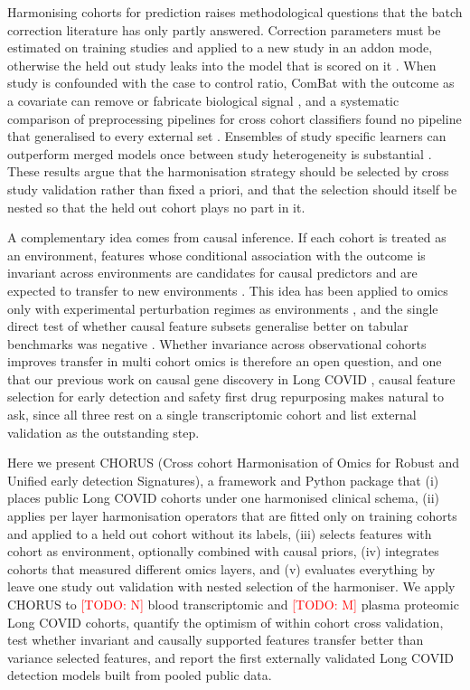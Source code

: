 \documentclass[unnumsec,webpdf,contemporary,large]{oup-authoring-template}
\newcommand{\todo}[1]{\textcolor{red}{[TODO: #1]}}
\begin{document}
Harmonising cohorts for prediction raises methodological questions that the batch correction literature has only partly answered. Correction parameters must be estimated on training studies and applied to a new study in an addon mode, otherwise the held out study leaks into the model that is scored on it \citep{hornung2017,parker2014}. When study is confounded with the case to control ratio, ComBat with the outcome as a covariate can remove or fabricate biological signal \citep{nygaard2016,zindler2020}, and a systematic comparison of preprocessing pipelines for cross cohort classifiers found no pipeline that generalised to every external set \citep{van2024}. Ensembles of study specific learners can outperform merged models once between study heterogeneity is substantial \citep{patil2018}. These results argue that the harmonisation strategy should be selected by cross study validation rather than fixed a priori, and that the selection should itself be nested so that the held out cohort plays no part in it.

A complementary idea comes from causal inference. If each cohort is treated as an environment, features whose conditional association with the outcome is invariant across environments are candidates for causal predictors and are expected to transfer to new environments \citep{peters2016,pfister2021,rothenhausler2021}. This idea has been applied to omics only with experimental perturbation regimes as environments \citep{meinshausen2016}, and the single direct test of whether causal feature subsets generalise better on tabular benchmarks was negative \citep{nastl2024}. Whether invariance across observational cohorts improves transfer in multi cohort omics is therefore an open question, and one that our previous work on causal gene discovery in Long COVID \citep{pinero2025mrcontrol}, causal feature selection for early detection \citep{pinero2026taco} and safety first drug repurposing \citep{pinero2026split} makes natural to ask, since all three rest on a single transcriptomic cohort and list external validation as the outstanding step.

Here we present CHORUS (Cross cohort Harmonisation of Omics for Robust and Unified early detection Signatures), a framework and Python package that (i) places public Long COVID cohorts under one harmonised clinical schema, (ii) applies per layer harmonisation operators that are fitted only on training cohorts and applied to a held out cohort without its labels, (iii) selects features with cohort as environment, optionally combined with causal priors, (iv) integrates cohorts that measured different omics layers, and (v) evaluates everything by leave one study out validation with nested selection of the harmoniser. We apply CHORUS to \todo{N} blood transcriptomic and \todo{M} plasma proteomic Long COVID cohorts, quantify the optimism of within cohort cross validation, test whether invariant and causally supported features transfer better than variance selected features, and report the first externally validated Long COVID detection models built from pooled public data.
\end{document}

